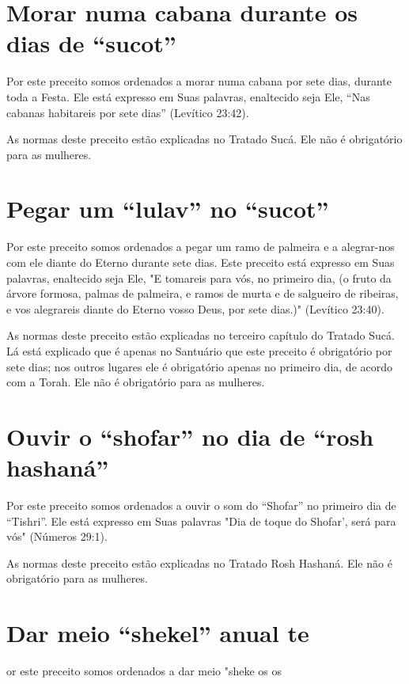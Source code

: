 \section{Morar numa cabana durante os dias de ``sucot''}

Por este preceito somos ordenados a morar numa cabana por sete dias,
durante toda a Festa. Ele está expresso em Suas palavras, enaltecido
seja Ele, ``Nas cabanas habitareis por sete dias'' (Levítico 23:42).

As normas deste preceito estão explicadas no Tratado Sucá. Ele não é
obrigatório para as mulheres.

\section{Pegar um ``lulav'' no ``sucot''}

Por este preceito somos ordenados a pegar um ramo de palmeira e a
alegrar-nos com ele diante do Eterno durante sete dias. Este preceito
está ex­presso em Suas palavras, enaltecido seja Ele, "E tomareis para
vós, no primeiro dia, (o fruto da árvore formosa, palmas de palmeira, e
ramos de murta e de sal­gueiro de ribeiras, e vos alegrareis diante do
Eterno vosso Deus, por sete dias.)" (Levítico 23:40).

As normas deste preceito estão explicadas no terceiro capítulo do
Tratado Sucá. Lá está explicado que é apenas no Santuário que este
preceito é obrigatório por sete dias; nos outros lugares ele é
obrigatório apenas no pri­meiro dia, de acordo com a Torah. Ele não é
obrigatório para as mulheres.

\section{Ouvir o ``shofar'' no dia de ``rosh hashaná''}

Por este preceito somos ordenados a ouvir o som do ``Shofar'' no primeiro
dia de ``Tishri''. Ele está expresso em Suas palavras "Dia de toque do
Shofar', será para vós" (Números 29:1).

As normas deste preceito estão explicadas no Tratado Rosh Hasha­ná. Ele
não é obrigatório para as mulheres.


\section{Dar meio ``shekel'' anual te}


or este preceito somos ordenados a dar meio "sheke os os

